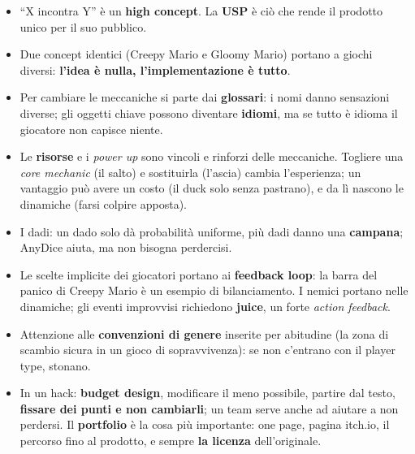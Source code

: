 \begin{itemize}
        BoardGameGeek, i commenti dei giocatori, gli amici. I player type di Bartle
        sono \textbf{falsi amici} (il killer non è un assassino, ma chi cerca
        emozioni forti): vanno descritti in termini che il team capisca.
  \item ``X incontra Y'' è un \textbf{high concept}. La \textbf{USP} è ciò che rende
        il prodotto unico per il suo pubblico.
  \item Due concept identici (Creepy Mario e Gloomy Mario) portano a giochi diversi:
        \textbf{l'idea è nulla, l'implementazione è tutto}.
  \item Per cambiare le meccaniche si parte dai \textbf{glossari}: i nomi danno
        sensazioni diverse; gli oggetti chiave possono diventare \textbf{idiomi}, ma
        se tutto è idioma il giocatore non capisce niente.
  \item Le \textbf{risorse} e i \emph{power up} sono vincoli e rinforzi delle
        meccaniche. Togliere una \emph{core mechanic} (il salto) e sostituirla
        (l'ascia) cambia l'esperienza; un vantaggio può avere un costo (il duck solo
        senza pastrano), e da lì nascono le dinamiche (farsi colpire apposta).
  \item I dadi: un dado solo dà probabilità uniforme, più dadi danno una
        \textbf{campana}; AnyDice aiuta, ma non bisogna perdercisi.
  \item Le scelte implicite dei giocatori portano ai \textbf{feedback loop}: la barra
        del panico di Creepy Mario è un esempio di bilanciamento. I nemici portano
        nelle dinamiche; gli eventi improvvisi richiedono \textbf{juice}, un forte
        \emph{action feedback}.
  \item Attenzione alle \textbf{convenzioni di genere} inserite per abitudine (la zona
        di scambio sicura in un gioco di sopravvivenza): se non c'entrano con il player
        type, stonano.
  \item In un hack: \textbf{budget design}, modificare il meno possibile, partire dal
        testo, \textbf{fissare dei punti e non cambiarli}; un team serve anche ad
        aiutare a non perdersi. Il \textbf{portfolio} è la cosa più importante: one
        page, pagina itch.io, il percorso fino al prodotto, e sempre \textbf{la
        licenza} dell'originale.
\end{itemize}

